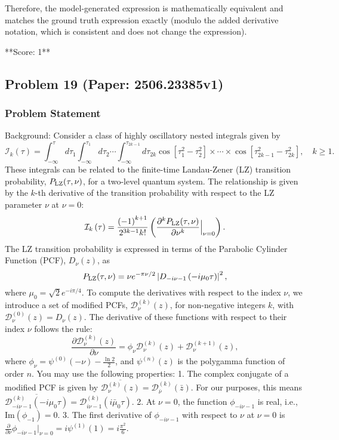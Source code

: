 \documentclass[10pt]{article}
\begin{document}
Therefore, the model-generated expression is mathematically equivalent and matches the ground truth expression exactly (modulo the added derivative notation, which is consistent and does not change the expression).

**Score: 1**

\newpage
\subsection*{Problem 19 (Paper: 2506.23385v1)}
\subsubsection*{Problem Statement}
Background:
Consider a class of highly oscillatory nested integrals given by
$$ \mathcal{I}_{k}(\tau)=\int^\tau_{-\infty}d\tau_{1}\int^{\tau_{1}}_{-\infty}d\tau_{2} \cdots\int^{\tau_{2k-1}}_{-\infty}d\tau_{2k}\cos[\tau^{2}_{1}-\tau^{2}_{2}]\times\cdots\times\cos[ \tau^{2}_{2k-1}-\tau^{2}_{2k}], \quad k\ge 1. $$
These integrals can be related to the finite-time Landau-Zener (LZ) transition probability, $P_{\rm LZ}(\tau,\nu)$, for a two-level quantum system. The relationship is given by the $k$-th derivative of the transition probability with respect to the LZ parameter $\nu$ at $\nu=0$:
$$ \mathcal{I}_{k}\left(\tau\right)=\frac{\left(-1\right)^{k+1}}{2^{3k-1}k!}\left(\frac{\partial^{k}P_{\rm LZ}(\tau,\nu)}{\partial \nu^{k}}\Big|_{\nu=0}\right). $$
The LZ transition probability is expressed in terms of the Parabolic Cylinder Function (PCF), $D_{\nu}(z)$, as
$$ P_{\rm LZ}(\tau,\nu)=\nu e^{-\pi\nu/2}\left|D_{-i\nu-1}\left(-i\mu_0\tau\right)\right|^{2}, $$
where $\mu_0=\sqrt{2}e^{-i\pi/4}$. To compute the derivatives with respect to the index $\nu$, we introduce a set of modified PCFs, $\mathcal{D}^{\left(k\right)}_{\nu}\left(z\right)$, for non-negative integers $k$, with $\mathcal{D}^{\left(0\right)}_{\nu}\left(z\right) = D_{\nu}\left(z\right)$. The derivative of these functions with respect to their index $\nu$ follows the rule:
$$ \frac{\partial \mathcal{D}^{\left(k\right)}_{\nu}\left(z\right)}{\partial \nu}=\phi_{\nu}\mathcal{D}^{\left(k\right)}_{\nu}\left(z\right)+\mathcal{D}^{\left(k+1\right)}_{\nu}\left(z\right), $$
where $\phi_{\nu}=\psi^{\left(0\right)}\left(-\nu\right)-\frac{\ln 2}{2}$, and $\psi^{(n)}(z)$ is the polygamma function of order $n$. You may use the following properties:
1. The complex conjugate of a modified PCF is given by $\overline{\mathcal{D}^{(k)}_{\nu}(z)} = \mathcal{D}^{(k)}_{\bar{\nu}}(\bar{z})$. For our purposes, this means $\overline{\mathcal{D}^{(k)}_{-i\nu-1}(-i\mu_0\tau)} = \mathcal{D}^{(k)}_{i\nu-1}(i\bar{\mu}_0\tau)$.
2. At $\nu=0$, the function $\phi_{-i\nu-1}$ is real, i.e., $\mathrm{Im}(\phi_{-1})=0$.
3. The first derivative of $\phi_{-i\nu-1}$ with respect to $\nu$ at $\nu=0$ is $\frac{\partial}{\partial\nu}\phi_{-i\nu-1}\Big|_{\nu=0} = i\psi^{(1)}(1) = i\frac{\pi^2}{6}$.
\end{document}
